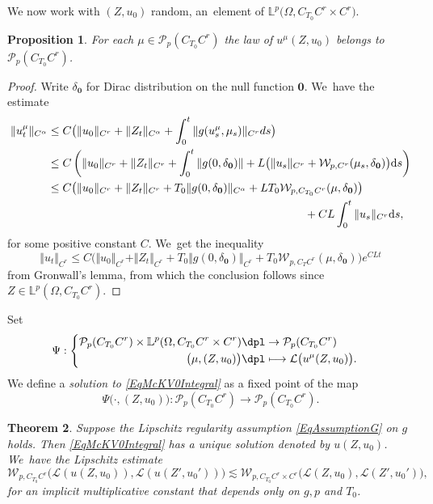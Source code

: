 \documentclass[JEP,XML,SOM,Unicode,published]{cedram}
\newcommand\mto{\mathchoice{\longmapsto}{\mapsto}{\mapsto}{\mapsto}}
\newtheorem{thm}{Theorem}
\newtheorem{prop}[thm]{Proposition}
\theoremstyle{definition}
\newcommand{\bfzero}{\mathbf{0}}
\newcommand{\mcL}{\mathcal{L}}
\newcommand{\mcP}{\mathcal{P}}
\newcommand\mcW{\mathcal W}
\newcommand{\bbL}{\mathbb{L}}
\newcommand{\dd}{\textup{d}}
\newcommand{\norme}[1]{\Vert #1 \Vert}
\begin{document}
We now work with $(Z,u_0)$ random, an~element of $\bbL^p\bigl(\Omega, C_{T_0}C^r \times C^r\bigr)$.

\begin{prop}
For each $\mu\!\in\!\mathcal{P}_p(C_{T_0}C^r)$ the law of $u^\mu(Z,u_0)$ belongs to~$\mcP_p(C_{T_0}C^r)$.
\end{prop}

\begin{proof}
Write $\delta_{\bfzero}$ for Dirac distribution on the null function $\bfzero$. We~have the estimate
\begin{align*}
\norme{u_t^\mu}_{C^\alpha} &\leq C\bigl( \norme{u_0}_{C^r} + \norme{Z_t}_{C^\alpha} + \int_0^t \norme{ g(u_s^\mu,\mu_s)}_{C^r} ds \bigr) \\
&\leq C\left( \norme{u_0}_{C^r}+\norme{Z_t}_{C^r}+\int_0^t \norme{g(0,\delta_{\bfzero})}+L\bigl(\norme{u_s}_{C^r}+\mcW_{p,C^r}(\mu_s,\delta_{\bfzero}) \bigr)\dd s \right) \\
&\leq C\bigl( \norme{u_0}_{C^r}+\norme{Z_t}_{C^r} + T_0 \norme{g(0,\delta_{\bfzero})}_{C^\alpha} + L T_0 \mcW_{p,C_{T_0}C^r}(\mu,\delta_{\bfzero}) \bigr) \\
&\hspace*{8cm}+ CL \int_0^t\norme{u_s}_{C^r} \dd s,
\end{align*}
for some positive constant $C$. We~get the inequality
\[
\norme{u_t}_{C^r}\leq C\bigl( \norme{u_0}_{C^r}+\norme{Z_t}_{C^r} + T_0 \norme{g(0,\delta_{\bfzero})}_{C^r} + T_0\mcW_{p,C_TC^r}(\mu,\delta_{\bfzero}) \bigr)e^{CLt}
\]
from Gronwall's lemma, from which the conclusion follows since $Z\in \bbL^p(\Omega,C_{T_0}C^r)$.
\end{proof}

Set
\[
\Psi :
\begin{cases}
\begin{aligned} \mathcal{P}_p(C_{T_0}C^r) \times \bbL^p(\Omega, C_{T_0}C^r\times C^r) & \dpl\to \mathcal{P}_p(C_{T_0} C^r) \\ \bigl(\mu, (Z,u_0)\bigr) & \dpl\mto \mcL\bigl(u^\mu(Z,u_0)\bigr).\end{aligned}
\end{cases}
\]
We define a \emph{solution to \eqref{EqMcKV0Integral}} as a fixed point of the map
\[
\Psi\bigl(\cdot,(Z,u_0)\bigr) : \mathcal{P}_p(C_{T_0} C^r)\to \mathcal{P}_p(C_{T_0} C^r).
\]

\begin{thm} \label{ThmAffine}
Suppose the Lipschitz regularity assumption \eqref{EqAssumptionG} on $g$ holds. Then \eqref{EqMcKV0Integral} has a unique solution denoted by $u(Z,u_0)$. We~have the Lipschitz estimate
\begin{equation} \label{EqLispchitzEstimate}
\mathcal{W}_{p,C_{T_0}C^r}\bigl(\mcL(u(Z,u_0)), \mcL(u(Z', u_0' ))\bigr) \lesssim \mathcal{W}_{p,C_{T_0}C^r\times C^r}\bigl(\mcL(Z,u_0), \mcL(Z', u_0' )\bigr),
\end{equation}
for an implicit multiplicative constant that depends only on $g,p$ and $T_0$.
\end{thm}
\end{document}
